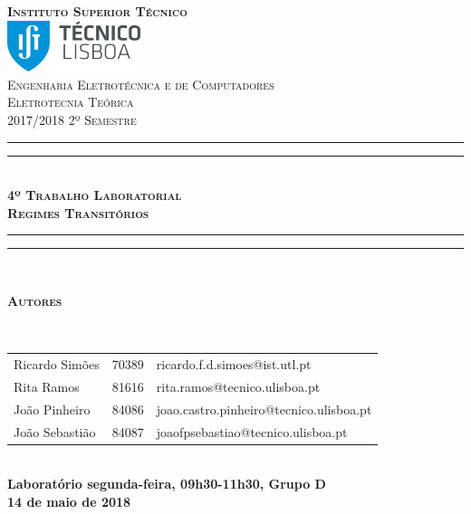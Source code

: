 \documentclass[a4paper, titlepage, portuguese]{article}
\begin{document}
	\begin{titlepage}
		\center
		\textsc{\bfseries\LARGE Instituto Superior Técnico}\\[1cm] %
		\includegraphics[height=1.5cm]{IST_Logo.pdf}\\[2.5cm]

		\textsc{\large Engenharia Eletrotécnica e de Computadores}\\[0.5cm] %
		\textsc{\Large Eletrotecnia Teórica}\\[0.5cm] %
		\textsc{\large 2017/2018 2º Semestre}\\[2cm]

		\rule{\textwidth}{1.6pt}\vspace*{-\baselineskip}\vspace*{2pt} %
		\rule{\textwidth}{0.4pt}\\[\baselineskip] %
			\textsc{\Huge \bfseries 4º Trabalho Laboratorial}\\[0.2cm]
			\bigskip
			\textsc{\large \bfseries Regimes Transitórios}\\[0.2cm]
		\rule{\textwidth}{0.4pt}\vspace*{-\baselineskip}\vspace{3.2pt} %
		\rule{\textwidth}{1.6pt}\\[6cm]

		\begin{minipage}{0.9\textwidth}
			\begin{flushleft} \large
				\begin{Large}\bfseries\textsc{Autores}\end{Large}\\[0.4cm]
				\begin{tabular}{l l l}
					Ricardo Simões	& 70389 & \normalsize ricardo.f.d.simoes@ist.utl.pt \\
					Rita Ramos			& 81616 & \normalsize rita.ramos@tecnico.ulisboa.pt \\
					João Pinheiro		& 84086 & \normalsize joao.castro.pinheiro@tecnico.ulisboa.pt \\
					João Sebastião	& 84087 & \normalsize joaofpsebastiao@tecnico.ulisboa.pt \\
				\end{tabular}
			\end{flushleft}
		\end{minipage}\\[0.5cm]

		\large \bfseries Laboratório segunda-feira, 09h30-11h30, Grupo D\\
		\large 14 de maio de 2018\\[1cm]
		\setcounter{page}{0}
	\end{titlepage}
\end{document}
